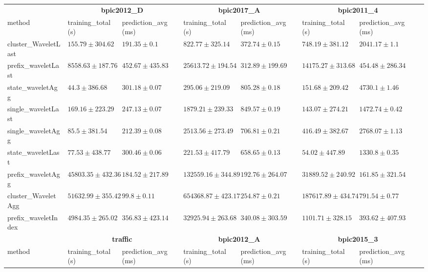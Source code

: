 \documentclass[twoside,11pt]{Latex/Classes/PhDthesisPSnPDF}
\begin{document}
\begin{table}[h]
{\begin{tabular}{llllllll}
	\bottomrule
	\toprule
	& \multicolumn{2}{c}{{\bfseries bpic2012\_D}} & \multicolumn{2}{c}{{\bfseries bpic2017\_A}} & \multicolumn{2}{c}{{\bfseries bpic2011\_4}} \\ \cmidrule(lr){2-3} \cmidrule(lr){4-5} \cmidrule(lr){6-7}
	method  & training\_total (s) & prediction\_avg (ms) & training\_total (s) & prediction\_avg (ms) & training\_total (s) & prediction\_avg (ms) \\ \midrule
	cluster\_WaveletLast & $155.79 \pm 304.62$ & $191.35 \pm 0.1$ & $822.77 \pm 325.14$ & $372.74 \pm 0.15$ & $748.19 \pm 381.12$ & $2041.17 \pm 1.1$ \\ 
	prefix\_waveletLast & $8558.63 \pm 187.76$ & $452.67 \pm 435.83$ & $25613.72 \pm 194.54$ & $312.89 \pm 199.69$ & $14175.27 \pm 313.68$ & $454.48 \pm 286.34$ \\ 
	state\_waveletAgg & $\mathbf{44.3 \pm 386.68}$ & $301.18 \pm 0.07$ & $295.06 \pm 219.09$ & $805.28 \pm 0.18$ & $151.68 \pm 209.42$ & $4730.1 \pm 1.46$ \\ 
	single\_waveletLast & $169.16 \pm 223.29$ & $247.13 \pm 0.07$ & $1879.21 \pm 239.33$ & $849.57 \pm 0.19$ & $143.07 \pm 274.21$ & $1472.74 \pm 0.42$ \\ 
	single\_waveletAgg & $85.5 \pm 381.54$ & $212.39 \pm 0.08$ & $2513.56 \pm 273.49$ & $706.81 \pm 0.21$ & $416.49 \pm 382.67$ & $2768.07 \pm 1.13$ \\ 
	state\_waveletLast & $77.53 \pm 438.77$ & $300.46 \pm 0.06$ & $\mathbf{221.53 \pm 417.79}$ & $658.65 \pm 0.13$ & $\mathbf{54.02 \pm 447.89}$ & $1330.8 \pm 0.35$ \\ 
	prefix\_waveletAgg & $45803.35 \pm 432.36$ & $184.52 \pm 217.89$ & $132559.16 \pm 344.89$ & $\mathbf{192.76 \pm 264.07}$ & $31889.52 \pm 240.92$ & $\mathbf{161.85 \pm 321.54}$ \\ 
	cluster\_WaveletAgg & $51632.99 \pm 355.42$ & $\mathbf{99.8 \pm 0.11}$ & $654368.87 \pm 423.17$ & $254.87 \pm 0.21$ & $187617.89 \pm 434.74$ & $791.54 \pm 0.77$ \\ 
	prefix\_waveletIndex & $4984.35 \pm 265.02$ & $356.83 \pm 423.14$ & $32925.94 \pm 263.68$ & $340.08 \pm 303.59$ & $1101.71 \pm 328.15$ & $393.62 \pm 407.93$ \\ 
	\bottomrule
	\toprule
	& \multicolumn{2}{c}{{\bfseries traffic}} & \multicolumn{2}{c}{{\bfseries bpic2012\_A}} & \multicolumn{2}{c}{{\bfseries bpic2015\_3}} \\ \cmidrule(lr){2-3} \cmidrule(lr){4-5} \cmidrule(lr){6-7}
	method  & training\_total (s) & prediction\_avg (ms) & training\_total (s) & prediction\_avg (ms) & training\_total (s) & prediction\_avg (ms) \\ \midrule

\end{tabular}}
\end{table}
\end{document}
